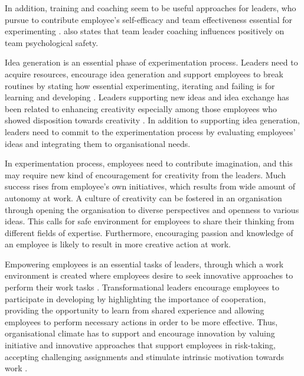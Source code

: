 In addition, training and coaching seem to be useful approaches for leaders, who pursue to contribute employee's self-efficacy and team effectiveness essential for experimenting \citep{amabile1998kill}. \citet{edmondson1999psychological} also states that team leader coaching influences positively on team psychological safety. 

Idea generation is an essential phase of experimentation process. Leaders need to acquire resources, encourage idea generation \citep{mcgourty1996managing} and support employees to break routines by stating how essential experimenting, iterating and failing is for learning and developing \citep{amabile2008creativity,shalley2004leaders}. Leaders supporting new ideas and idea exchange has been related to enhancing creativity especially among those employees who showed disposition towards creativity \citep{oldham1996employee}. In addition to supporting idea generation, leaders need to commit to the experimentation process by evaluating employees' ideas and integrating them to organisational needs\citep{mumford2002leading}.

In experimentation process, employees need to contribute imagination, and this may require new kind of encouragement for creativity from the leaders. Much success rises from employee's own initiatives, which results from wide amount of autonomy at work. \citep{amabile2008creativity} A culture of creativity can be fostered in an organisation through opening the organisation to diverse perspectives and openness to various ideas. This calls for safe environment for employees to share their thinking from different fields of expertise. Furthermore, encouraging passion and knowledge of an employee is likely to result in more creative action at work. \citep{amabile2008creativity}

Empowering employees is an essential tasks of leaders, through which a work environment is created where employees desire to seek innovative approaches to perform their work tasks \citep{jung2003role}. Transformational leaders encourage employees to participate in developing by highlighting the importance of cooperation, providing the opportunity to learn from shared experience and allowing employees to perform necessary actions in order to be more effective\citep{bass1990implications}. Thus, organisational climate has to support and encourage innovation \citep{mumford1988creativity} by valuing initiative and innovative approaches that support employees in risk-taking, accepting challenging assignments and stimulate intrinsic motivation towards work \citep{jung2003role}.

